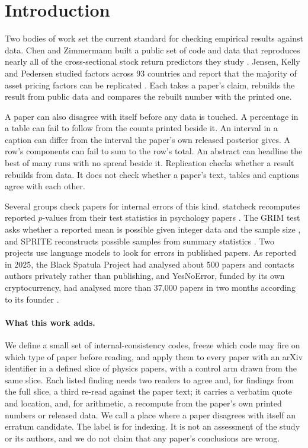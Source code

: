 \documentclass[reprint,amsmath,amssymb,aps,superscriptaddress,nofootinbib]{revtex4-2}
\begin{document}
\section{Introduction}

Two bodies of work set the current standard for checking empirical results against data. Chen and Zimmermann built a public set of code and data that reproduces nearly all of the cross-sectional stock return predictors they study \cite{ChenZimmermann2022}. Jensen, Kelly and Pedersen studied factors across 93 countries and report that the majority of asset pricing factors can be replicated \cite{JKP2023}. Each takes a paper's claim, rebuilds the result from public data and compares the rebuilt number with the printed one.

A paper can also disagree with itself before any data is touched. A percentage in a table can fail to follow from the counts printed beside it. An interval in a caption can differ from the interval the paper's own released posterior gives. A row's components can fail to sum to the row's total. An abstract can headline the best of many runs with no spread beside it. Replication checks whether a result rebuilds from data. It does not check whether a paper's text, tables and captions agree with each other.

Several groups check papers for internal errors of this kind. statcheck recomputes reported $p$-values from their test statistics in psychology papers \cite{Nuijten2016}. The GRIM test asks whether a reported mean is possible given integer data and the sample size \cite{BrownHeathers2017}, and SPRITE reconstructs possible samples from summary statistics \cite{Heathers2018}. Two projects use language models to look for errors in published papers. As reported in 2025, the Black Spatula Project had analysed about 500 papers and contacts authors privately rather than publishing, and YesNoError, funded by its own cryptocurrency, had analysed more than 37,000 papers in two months according to its founder \cite{Gibney2025}.

\paragraph*{What this work adds.} We define a small set of internal-consistency codes, freeze which code may fire on which type of paper before reading, and apply them to every paper with an arXiv identifier in a defined slice of physics papers, with a control arm drawn from the same slice. Each listed finding needs two readers to agree and, for findings from the full slice, a third re-read against the paper text; it carries a verbatim quote and location, and, for arithmetic, a recompute from the paper's own printed numbers or released data. We call a place where a paper disagrees with itself an erratum candidate. The label is for indexing. It is not an assessment of the study or its authors, and we do not claim that any paper's conclusions are wrong.
\end{document}
